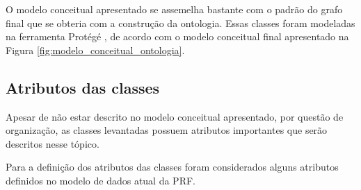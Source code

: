 	  O modelo conceitual apresentado se assemelha bastante com o padrão do grafo final que se obteria com a construção da
	  ontologia.
	  Essas classes foram modeladas na ferramenta Protégé \footnotemark[2], de acordo com o modelo conceitual final
	  apresentado na Figura \ref{fig:modelo_conceitual_ontologia}.

      
      \vfill
      \pagebreak
      \subsection{Atributos das classes}
	
	  Apesar de não estar descrito no modelo conceitual apresentado, por questão de organização, as classes levantadas
	  possuem atributos importantes que serão descritos nesse tópico.
	  
	  Para a definição dos atributos das classes foram considerados alguns atributos definidos no modelo de dados atual
	  da PRF.
	  
	  

      
